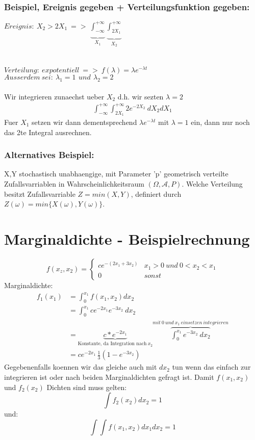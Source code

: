 \documentclass{article}
\begin{document}
\subsubsection{Beispiel, Ereignis gegeben + Verteilungsfunktion gegeben:}
$Ereignis: \: X_2 > 2X_1 \: => \: \underbrace{\int_{-\infty}^{+\infty}}_{X_1}
\underbrace{\int_{2X_1}^{+\infty}}_{X_2}$\\ \\ \\
$Verteilung: \: expotentiell \: => \: f(\lambda) = \lambda e^{-\lambda t}$ \\
$Ausserdem \: sei: \:  \lambda_1 = 1 \:\, und \:\, \lambda_2 =2 $\\ \\
Wir integrieren zunaechst ueber $X_2$ d.h. wir sezten $\lambda = 2$
\[
	\begin{split}
		\int_{-\infty}^{+\infty} \int_{2X_1}^{+\infty} 2 e^{-2 X_2} \: dX_2 dX_1
	\end{split}
\]
Fuer $X_1$ setzen wir dann dementsprechend  $\lambda e^{-\lambda t}$ mit $\lambda = 1$ ein, dann nur noch das 2te Integral ausrechnen.
\subsubsection{Alternatives Beispiel:}
X,Y stochastisch unabhaengige, mit Parameter 'p' geometrisch verteilte Zufallsvarriablen 	in Wahrscheinlichkeitsraum $(\varOmega , \mathcal{A},P)$. Welche Verteilung besitzt 
Zufallsvarriable $Z = min(X,Y)$, definiert durch $Z( \omega ) = min \{X(\omega),Y(\omega)\}$.\\


\section{Marginaldichte - Beispielrechnung}
\[	
	f(x_z,x_2)=
	\begin{cases}
		ce^{-(2x_1+3x_2)} & x_1  > 0 \: und \: 0 < x_2 <x_1 \\
		0 & sonst
	\end{cases}
\]
Marginaldichte:
\[
	\begin{split}
		f_1(x_1) 	& = \int_{0}^{x_1} f(x_1,x_2) dx_2 \\
						   & = \int_{0}^{x_1} ce^{-2x_1}e^{-3x_2} \: dx_2 \\
						& = \underbrace{c*e^{-2x_1}}_{\text{Konstante, da Integration nach} \: x_2}  \overbrace{\int_{0}^{x_1} e^{-3x_2} \: dx_2}^{mit \: 0 \: und \: x_1 \: einsetzen \: integrieren} \\
					 & = ce^{-2x_1}\, \frac{1}{3} (1-e^{-3x_2} )
	\end{split}
\]
Gegebenenfalls koennen wir das gleiche auch mit $dx_2$ tun wenn das einfach zur integrieren ist oder nach beiden Marginaldichten gefragt ist.
Damit $f(x_1,x_2)$ und $f_2(x_2)$ Dichten sind muss gelten:
\[
	\int f_2(x_2) dx_2 = 1
\]
und:
\[
	\int \int f(x_1,x_2) dx_1 dx_2 = 1
\]
\end{document}
